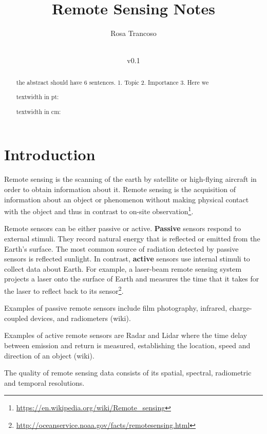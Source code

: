 \documentclass{article}
\title{Remote Sensing Notes}
\author{Rosa Trancoso}
\date{\filemodprint{report.tex}\\v0.1}
\begin{document}
\maketitle

\begin{abstract}
the abstract should have 6 sentences. 1. Topic 2. Importance 3. Here we

textwidth in pt: \the\textwidth

textwidth in cm: \prntlen{\textwidth}
 
\end{abstract}

\tableofcontents

\section{Introduction}
\label{sec:intro}


Remote sensing is the scanning of the earth by satellite or high-flying aircraft in order to obtain information about it.
Remote sensing is the acquisition of information about an object or phenomenon without making physical contact with the object and thus in contrast to on-site observation\footnote{\url{https://en.wikipedia.org/wiki/Remote_sensing}}.

Remote sensors can be either passive or active. \textbf{Passive} sensors respond to external stimuli. They record natural energy that is reflected or emitted from the Earth's surface. The most common source of radiation detected by passive sensors is reflected sunlight. In contrast, \textbf{active} sensors use internal stimuli to collect data about Earth. For example, a laser-beam remote sensing system projects a laser onto the surface of Earth and measures the time that it takes for the laser to reflect back to its sensor\footnote{\url{http://oceanservice.noaa.gov/facts/remotesensing.html}}.

Examples of passive remote sensors include film photography, infrared, charge-coupled devices, and radiometers (wiki).

Examples of active remote sensors are Radar and Lidar where the time delay between emission and return is measured, establishing the location, speed and direction of an object (wiki).

The quality of remote sensing data consists of its spatial, spectral, radiometric and temporal resolutions.
\end{document}

